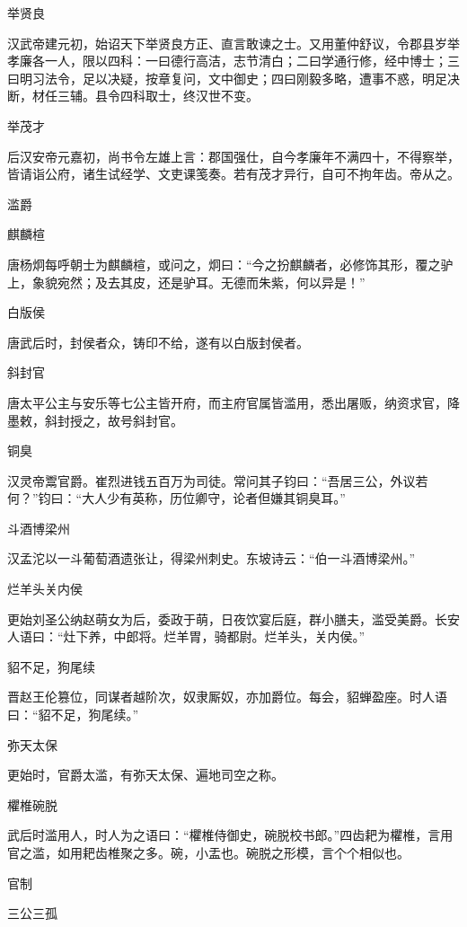 \documentclass[a4paper,12pt,UTF8,twoside]{ctexbook}
\begin{document}
    举贤良
    
    汉武帝建元初，始诏天下举贤良方正、直言敢谏之士。又用董仲舒议，令郡县岁举孝廉各一人，限以四科：一曰德行高洁，志节清白；二曰学通行修，经中博士；三曰明习法令，足以决疑，按章复问，文中御史；四曰刚毅多略，遭事不惑，明足决断，材任三辅。县令四科取士，终汉世不变。
    
    举茂才
    
    后汉安帝元嘉初，尚书令左雄上言：郡国强仕，自今孝廉年不满四十，不得察举，皆请诣公府，诸生试经学、文吏课笺奏。若有茂才异行，自可不拘年齿。帝从之。
    
    滥爵
    
    麒麟楦
    
    唐杨炯每呼朝士为麒麟楦，或问之，炯曰：“今之扮麒麟者，必修饰其形，覆之驴上，象貌宛然；及去其皮，还是驴耳。无德而朱紫，何以异是！”
    
    白版侯
    
    唐武后时，封侯者众，铸印不给，遂有以白版封侯者。
    
    斜封官
    
    唐太平公主与安乐等七公主皆开府，而主府官属皆滥用，悉出屠贩，纳资求官，降墨敕，斜封授之，故号斜封官。
    
    铜臭
    
    汉灵帝鬻官爵。崔烈进钱五百万为司徒。常问其子钧曰：“吾居三公，外议若何？”钧曰：“大人少有英称，历位卿守，论者但嫌其铜臭耳。”
    
    斗酒博梁州
    
    汉孟沱以一斗葡萄酒遗张让，得梁州刺史。东坡诗云：“伯一斗酒博梁州。”
    
    烂羊头关内侯
    
    更始刘圣公纳赵萌女为后，委政于萌，日夜饮宴后庭，群小膳夫，滥受美爵。长安人语曰：“灶下养，中郎将。烂羊胃，骑都尉。烂羊头，关内侯。”
    
    貂不足，狗尾续
    
    晋赵王伦篡位，同谋者越阶次，奴隶厮奴，亦加爵位。每会，貂蝉盈座。时人语曰：“貂不足，狗尾续。”
    
    弥天太保
    
    更始时，官爵太滥，有弥天太保、遍地司空之称。
    
    欋椎碗脱
    
    武后时滥用人，时人为之语曰：“欋椎侍御史，碗脱校书郎。”四齿耙为欋椎，言用官之滥，如用耙齿椎聚之多。碗，小盂也。碗脱之形模，言个个相似也。
    
    官制
    
    三公三孤
    
\end{document}
